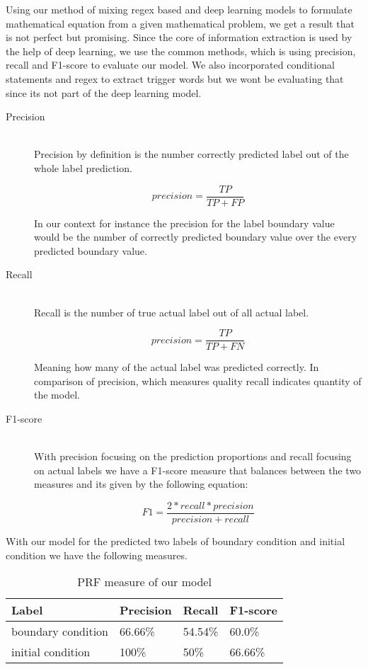 
Using our method of mixing regex based and deep learning models to formulate mathematical equation from a given mathematical problem, we get a result that is not perfect but promising. 
Since the core of information extraction is used by the help of deep learning, we use the common methods, which is using precision, recall and F1-score to evaluate our model. We also incorporated conditional statements and regex to extract trigger words but we wont be evaluating that since its not part of the deep learning model. 

\begin{description}
\item[Precision]\hfill \\
Precision by definition is the number correctly predicted label out of the whole label prediction. 
 
 \[ precision=\frac{TP}{TP+FP}\]

In our context for instance the precision for the label boundary value would be the number of correctly predicted boundary value over the every predicted boundary value.

\item[Recall]\hfill \\
Recall is the number of true actual label out of all actual label.

\[precision=\frac{TP}{TP+FN}\]

Meaning how many of the actual label was predicted correctly. In comparison of precision, which measures quality recall indicates quantity of the model.

\item[F1-score]\hfill \\
With precision focusing on the prediction proportions and recall focusing on actual labels we have a F1-score measure that balances between the two measures and its given by the following equation:

    \[F1=\frac{2*recall*precision}{precision+recall}\]




\end{description}

\newpage
With our model for the predicted two labels of boundary condition and initial condition we have the following measures. 


\begin{table}[ht]
    \begin{center}
    \label{tab:my_label}
    \begin{tabular}{p{100pt}|p{60pt}|p{60pt}|p{60pt}}
        Label    & Precision &   Recall    &    F1-score \\
        \hline
        boundary condition &66.66\% & 54.54\%& 60.0\% \\
        initial condition &100\% & 50\% & 66.66\%

    \end{tabular}
    \end{center}
    \caption{PRF measure of our model}

\end{table}

